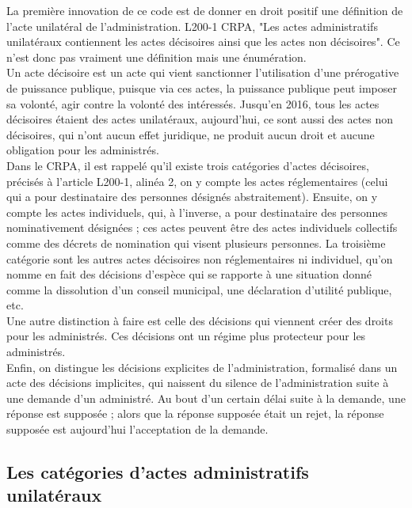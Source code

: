 \documentclass[10pt, a4paper, openany]{book}
\begin{document}
La première innovation de ce code est de donner en droit positif une définition de l'acte unilatéral de l'administration. L200-1 CRPA, "Les actes administratifs unilatéraux contiennent les actes décisoires ainsi que les actes non décisoires". Ce n'est donc pas vraiment une définition mais une énumération. \\
Un acte décisoire est un acte qui vient sanctionner l'utilisation d'une prérogative de puissance publique, puisque via ces actes, la puissance publique peut imposer sa volonté, agir contre la volonté des intéressés. Jusqu'en 2016, tous les actes décisoires étaient des actes unilatéraux, aujourd'hui, ce sont aussi des actes non décisoires, qui n'ont aucun effet juridique, ne produit aucun droit et aucune obligation pour les administrés. \\
Dans le CRPA, il est rappelé qu'il existe trois catégories d'actes décisoires, précisés à l'article L200-1, alinéa 2, on y compte les actes réglementaires (celui qui a pour destinataire des personnes désignés abstraitement). Ensuite, on y compte les actes individuels, qui, à l'inverse, a pour destinataire des personnes nominativement désignées ; ces actes peuvent être des actes individuels collectifs comme des décrets de nomination qui visent plusieurs personnes. La troisième catégorie sont les autres actes décisoires non réglementaires ni individuel, qu'on nomme en fait des décisions d'espèce qui se rapporte à une situation donné comme la dissolution d'un conseil municipal, une déclaration d'utilité publique, etc. \\
Une autre distinction à faire est celle des décisions qui viennent créer des droits pour les administrés. Ces décisions ont un régime plus protecteur pour les administrés. \\
Enfin, on distingue les décisions explicites de l'administration, formalisé dans un acte des décisions implicites, qui naissent du silence de l'administration suite à une demande d'un administré. Au bout d'un certain délai suite à la demande, une réponse est supposée ; alors que la réponse supposée était un rejet, la réponse supposée est aujourd'hui l'acceptation de la demande. 

\subsection{Les catégories d'actes administratifs unilatéraux}
\end{document}
